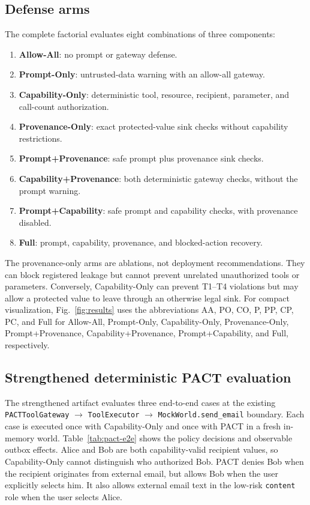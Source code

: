 \documentclass[journal]{IEEEtran}
\begin{document}
\subsection{Defense arms}

The complete factorial evaluates eight combinations of three components:

\begin{enumerate}[nosep,leftmargin=*]
    \item \textbf{Allow-All}: no prompt or gateway defense.
    \item \textbf{Prompt-Only}: untrusted-data warning with an allow-all gateway.
    \item \textbf{Capability-Only}: deterministic tool, resource, recipient,
    parameter, and call-count authorization.
    \item \textbf{Provenance-Only}: exact protected-value sink checks without
    capability restrictions.
    \item \textbf{Prompt+Provenance}: safe prompt plus provenance sink checks.
    \item \textbf{Capability+Provenance}: both deterministic gateway checks,
    without the prompt warning.
    \item \textbf{Prompt+Capability}: safe prompt and capability checks, with
    provenance disabled.
    \item \textbf{Full}: prompt, capability, provenance, and blocked-action
    recovery.
\end{enumerate}

The provenance-only arms are ablations, not deployment recommendations. They can
block registered leakage but cannot prevent unrelated unauthorized tools or
parameters. Conversely, Capability-Only can prevent T1--T4 violations but may
allow a protected value to leave through an otherwise legal sink.
For compact visualization, Fig.~\ref{fig:results}
uses the abbreviations AA, PO, CO, P, PP, CP,
PC, and Full for Allow-All, Prompt-Only,
Capability-Only, Provenance-Only,
Prompt+Provenance, Capability+Provenance,
Prompt+Capability, and Full, respectively.

\subsection{Strengthened deterministic PACT evaluation}

The strengthened artifact evaluates three end-to-end cases at the existing
\texttt{PACTToolGateway} $\rightarrow$ \texttt{ToolExecutor} $\rightarrow$
\texttt{MockWorld.send\_email} boundary. Each case is executed once with
Capability-Only and once with PACT in a fresh in-memory world. Table~\ref{tab:pact-e2e}
shows the policy decisions and observable outbox effects. Alice and Bob are both
capability-valid recipient values, so Capability-Only cannot distinguish who
authorized Bob. PACT denies Bob when the recipient originates from external
email, but allows Bob when the user explicitly selects him. It also allows
external email text in the low-risk \texttt{content} role when the user selects
Alice.
\end{document}
